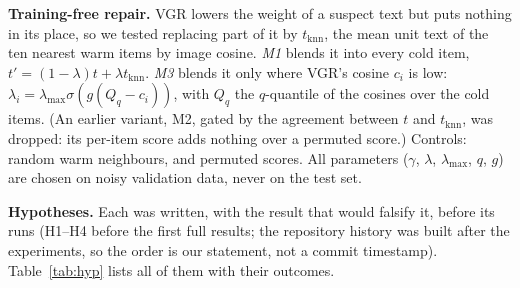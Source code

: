 \documentclass[conference]{IEEEtran}
\begin{document}
\textbf{Training-free repair.} VGR lowers the weight of a suspect text but puts nothing in its place, so we tested replacing part of it by $t_{\mathrm{knn}}$, the mean unit text of the ten nearest warm items by image cosine. \emph{M1} blends it into every cold item, $t'=(1-\lambda)t+\lambda t_{\mathrm{knn}}$. \emph{M3} blends it only where VGR's cosine $c_i$ is low: $\lambda_i=\lambda_{\max}\sigma(g(Q_q-c_i))$, with $Q_q$ the $q$-quantile of the cosines over the cold items. (An earlier variant, M2, gated by the agreement between $t$ and $t_{\mathrm{knn}}$, was dropped: its per-item score adds nothing over a permuted score.) Controls: random warm neighbours, and permuted scores. All parameters ($\gamma$, $\lambda$, $\lambda_{\max}$, $q$, $g$) are chosen on noisy validation data, never on the test set.

\textbf{Hypotheses.} Each was written, with the result that would falsify it, before its runs (H1--H4 before the first full results; the repository history was built after the experiments, so the order is our statement, not a commit timestamp). Table~\ref{tab:hyp} lists all of them with their outcomes.
\end{document}
